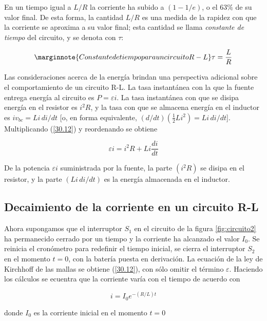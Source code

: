 En un tiempo igual a $L/R$ la corriente ha subido a $(1-1/e)$, o el $63\%$ de su valor final. De esta forma, la cantidad $L/R$ es una medida de la rapidez con que la corriente se aproxima a su valor final; esta cantidad se llama \textit{constante de tiempo} del circuito, y se denota con $\tau$:

\begin{equation}\label{30.16}\marginnote{Constante de tiempo para un circuito R-L}
\tau=\frac{L}{R}
\end{equation}

Las consideraciones acerca de la energía brindan una perspectiva adicional sobre el comportamiento de un circuito R-L. La tasa instantánea con la que la fuente entrega energía al circuito es $P=\varepsilon i$. La tasa instantánea con que se disipa energía en el resistor es $i^2R$, y la tasa con que se almacena energía en el inductor es $iv_{bc}=Li\, di/dt$ [o, en forma equivalente, $(d/dt)(\frac{1}{2}Li^2)=Li\, di/dt$]. Multiplicando (\ref{30.12}) y reordenando se obtiene

\begin{equation}\label{30.17}
\varepsilon i=i^2R+Li\frac{di}{dt}
\end{equation}

De la potencia $\varepsilon i$ suministrada por la fuente, la parte $(i^2R)$ se disipa en el resistor, y la parte $(Li\, di/dt)$ es la energía almacenada en el inductor.

\subsection{Decaimiento de la corriente en un circuito R-L}
Ahora supongamos que el interruptor $S_1$ en el circuito de la figura \ref{fig:circuito2} ha permanecido cerrado por un tiempo y la corriente ha alcanzado el valor $I_0$. Se reinicia el cronómetro para redefinir el tiempo inicial, se cierra el interruptor $S_2$ en el momento $t=0$, con la batería puesta en derivación. La ecuación de la ley de Kirchhoff de las mallas se obtiene (\ref{30.12}), con sólo omitir el término $\varepsilon$. Haciendo los cálculos se ecuentra que la corriente varía con el tiempo de acuerdo con

\begin{equation}\label{30.18}
\boxed{i=I_0e^{-(R/L)t}}
\end{equation}

donde $I_0$ es la corriente inicial en el momento $t=0$

